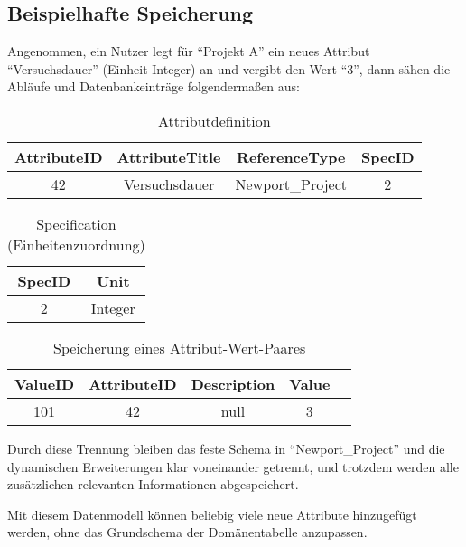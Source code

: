 \subsection{Beispielhafte Speicherung}
Angenommen, ein Nutzer legt für \enquote{Projekt A} ein neues Attribut \enquote{Versuchsdauer} (Einheit Integer) an und vergibt den Wert \enquote{3},
dann sähen die Abläufe und Datenbankeinträge folgendermaßen aus:
\begin{table}[h]
    \centering
    \caption{Attributdefinition}
    \label{tab:attribute}
    \begin{tabular}{@{}cccc@{}}
        \toprule
        \textbf{AttributeID} & \textbf{AttributeTitle} & \textbf{ReferenceType} & \textbf{SpecID} \\ 
        \midrule
        42 & Versuchsdauer & Newport\_Project & 2 \\ 
        \bottomrule
    \end{tabular}
\end{table}
\begin{table}[h]
    \centering
    \caption{Specification (Einheitenzuordnung)}
    \label{tab:specification}
    \begin{tabular}{@{}cc@{}}
        \toprule
        \textbf{SpecID} & \textbf{Unit} \\ 
        \midrule
        2 & Integer \\ 
        \bottomrule
    \end{tabular}
\end{table}
\begin{table}[h]
    \centering
    \caption{Speicherung eines Attribut-Wert-Paares}
    \label{tab:value}
    \begin{tabular}{@{}ccccc@{}}
        \toprule
        \textbf{ValueID} & \textbf{AttributeID} & \textbf{Description} & \textbf{Value} \\ 
        \midrule
        101 & 42 & null & 3 \\ 
        \bottomrule
    \end{tabular}
\end{table}

Durch diese Trennung bleiben das feste Schema in \enquote{Newport\_Project} und die dynamischen Erweiterungen 
klar voneinander getrennt, und trotzdem werden alle zusätzlichen relevanten Informationen abgespeichert.

Mit diesem Datenmodell können beliebig viele neue Attribute hinzugefügt werden, ohne das Grundschema der Domänentabelle anzupassen.
